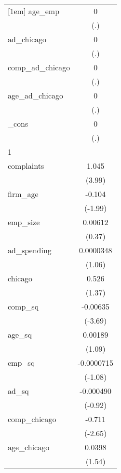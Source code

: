 {\begin{tabular}{l*{1}{c}}
[1em]
age\_emp     &           0         \\
            &         (.)         \\
[1em]
ad\_chicago  &           0         \\
            &         (.)         \\
[1em]
comp\_ad\_chicago&           0         \\
            &         (.)         \\
[1em]
age\_ad\_chicago&           0         \\
            &         (.)         \\
[1em]
\_cons      &           0         \\
            &         (.)         \\
\hline
1           &                     \\
complaints  &       1.045\sym{***}\\
            &      (3.99)         \\
[1em]
firm\_age    &      -0.104\sym{*}  \\
            &     (-1.99)         \\
[1em]
emp\_size    &     0.00612         \\
            &      (0.37)         \\
[1em]
ad\_spending &   0.0000348         \\
            &      (1.06)         \\
[1em]
chicago     &       0.526         \\
            &      (1.37)         \\
[1em]
comp\_sq     &    -0.00635\sym{***}\\
            &     (-3.69)         \\
[1em]
age\_sq      &     0.00189         \\
            &      (1.09)         \\
[1em]
emp\_sq      &  -0.0000715         \\
            &     (-1.08)         \\
[1em]
ad\_sq       &   -0.000490         \\
            &     (-0.92)         \\
[1em]
comp\_chicago&      -0.711\sym{**} \\
            &     (-2.65)         \\
[1em]
age\_chicago &      0.0398         \\
            &      (1.54)         \\

\end{tabular}}

